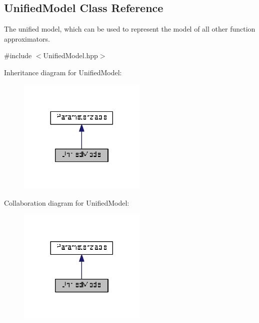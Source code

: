 \hypertarget{classDmpBbo_1_1UnifiedModel}{\subsection{Unified\+Model Class Reference}
\label{classDmpBbo_1_1UnifiedModel}
}


The unified model, which can be used to represent the model of all other function approximators.  




{\ttfamily \#include $<$Unified\+Model.\+hpp$>$}



Inheritance diagram for Unified\+Model\+:
\nopagebreak
\begin{figure}[H]
\begin{center}
\leavevmode
\includegraphics[width=173pt]{classDmpBbo_1_1UnifiedModel__inherit__graph}
\end{center}
\end{figure}


Collaboration diagram for Unified\+Model\+:
\nopagebreak
\begin{figure}[H]
\begin{center}
\leavevmode
\includegraphics[width=173pt]{classDmpBbo_1_1UnifiedModel__coll__graph}
\end{center}
\end{figure}
